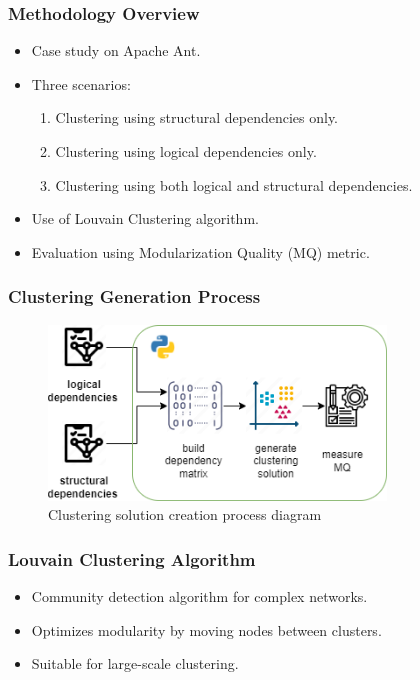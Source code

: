 \documentclass{beamer}
\begin{document}
\begin{frame}
\frametitle{Methodology Overview}
\begin{itemize}
    \item Case study on Apache Ant.
    \item Three scenarios:
    \begin{enumerate}
        \item Clustering using structural dependencies only.
        \item Clustering using logical dependencies only.
        \item Clustering using both logical and structural dependencies.
    \end{enumerate}
    \item Use of Louvain Clustering algorithm.
    \item Evaluation using Modularization Quality (MQ) metric.
\end{itemize}
\end{frame}

\begin{frame}
\frametitle{Clustering Generation Process}
\begin{center}
     \begin{figure}
    \includegraphics[width=0.8\textwidth]{clustering-generation.png}
    \caption{Clustering solution creation process diagram}
    \label{fig:clustering-gen}
     \end{figure}
\end{center}
\end{frame}

\begin{frame}
\frametitle{Louvain Clustering Algorithm}
\begin{itemize}
    \item Community detection algorithm for complex networks.
    \item Optimizes modularity by moving nodes between clusters.
    \item Suitable for large-scale clustering.
\end{itemize}
\end{frame}
\end{document}
